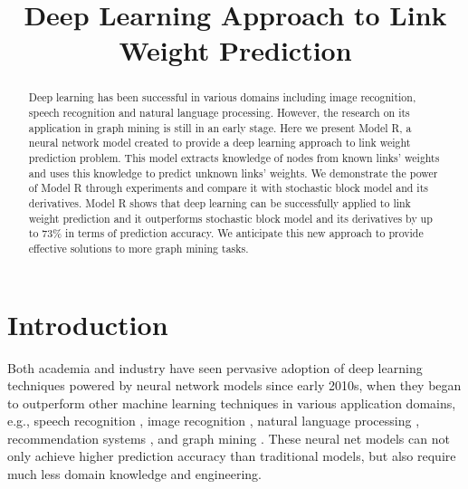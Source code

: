 \documentclass[conference]{IEEEtran}
\begin{document}
	\title{Deep Learning Approach to Link Weight Prediction}
	\author{
		\and
	}
	\maketitle

\begin{abstract}
	Deep learning has been successful in various domains 
	including image recognition, speech recognition and natural language 
	processing.
	However, the research on its application in graph mining is 
	still in an early stage.
	Here we present Model R, a neural network model created to provide a deep 
	learning approach to link weight prediction problem.
	This model extracts knowledge of nodes from known links' weights and 
	uses this knowledge to predict unknown links' weights.
	We demonstrate the power of Model R through experiments and compare it with 
	stochastic block model and its derivatives.
	Model R shows that deep learning can be successfully applied to 
	link weight prediction and it outperforms stochastic block model and its derivatives by up to 73\% in terms of prediction accuracy.
	We anticipate this new approach to provide effective solutions to more
	graph mining tasks.
\end{abstract}

\section{Introduction}
Both academia and industry have seen pervasive adoption of deep learning 
techniques powered by neural network models since early 2010s,
when they began to outperform other machine learning techniques in various 
application domains, e.g.,
speech recognition \cite{hannun2014deep},
image recognition \cite{simonyan2014very},
natural language processing \cite{yao2013recurrent},
recommendation systems \cite{barkan2016item2vec},
and graph mining \cite{grovernode2vec}.
These neural net models can not only achieve higher prediction accuracy than 
traditional models,
but also require much less domain knowledge and engineering.
\end{document}
